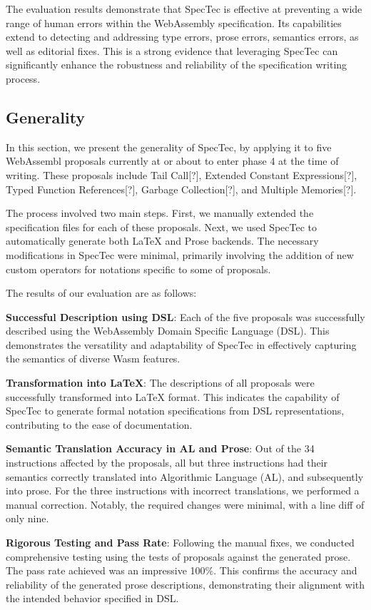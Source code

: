 The evaluation results demonstrate that SpecTec is effective at preventing a wide
range of human errors within the WebAssembly specification.  Its capabilities
extend to detecting and addressing type errors, prose errors, semantics errors,
as well as editorial fixes. This is a strong evidence that leveraging SpecTec
can significantly enhance the robustness and reliability of the specification
writing process.

\subsection{Generality}
In this section, we present the generality of SpecTec, by applying it to five
WebAssembl proposals currently at or about to enter phase 4 at the time of
writing. These proposals include Tail Call[?], Extended Constant
Expressions[?], Typed Function References[?], Garbage Collection[?], and
Multiple Memories[?].

The process involved two main steps. First, we manually extended the
specification files for each of these proposals. Next, we used SpecTec to
automatically generate both LaTeX and Prose backends. The necessary
modifications in SpecTec were minimal, primarily involving the addition of new
custom operators for notations specific to some of proposals.

The results of our evaluation are as follows:

\textbf{Successful Description using DSL}: Each of the five proposals was
successfully described using the WebAssembly Domain Specific Language (DSL).
This demonstrates the versatility and adaptability of SpecTec in effectively
capturing the semantics of diverse Wasm features.

\textbf{Transformation into LaTeX}: The descriptions of all proposals were
successfully transformed into LaTeX format. This indicates the capability of
SpecTec to generate formal notation specifications from DSL representations,
contributing to the ease of documentation.

\textbf{Semantic Translation Accuracy in AL and Prose}: Out of the 34
instructions affected by the proposals, all but three instructions had their
semantics correctly translated into Algorithmic Language (AL), and subsequently
into prose. For the three instructions with incorrect translations, we
performed a manual correction. Notably, the required changes were minimal, with
a line diff of only nine.

\textbf{Rigorous Testing and  Pass Rate}: Following the manual
fixes, we conducted comprehensive testing using the tests of proposals against
the generated prose. The pass rate achieved was an impressive 100\%. This
confirms the accuracy and reliability of the generated prose descriptions,
demonstrating their alignment with the intended behavior specified in DSL.

